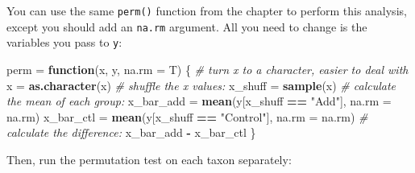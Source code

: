 \documentclass[]{book}
\newenvironment{Shaded}{\begin{snugshade}}{\end{snugshade}}
\newcommand{\KeywordTok}[1]{\textcolor[rgb]{0.13,0.29,0.53}{\textbf{#1}}}
\newcommand{\DataTypeTok}[1]{\textcolor[rgb]{0.13,0.29,0.53}{#1}}
\newcommand{\DecValTok}[1]{\textcolor[rgb]{0.00,0.00,0.81}{#1}}
\newcommand{\StringTok}[1]{\textcolor[rgb]{0.31,0.60,0.02}{#1}}
\newcommand{\CommentTok}[1]{\textcolor[rgb]{0.56,0.35,0.01}{\textit{#1}}}
\newcommand{\ControlFlowTok}[1]{\textcolor[rgb]{0.13,0.29,0.53}{\textbf{#1}}}
\newcommand{\OperatorTok}[1]{\textcolor[rgb]{0.81,0.36,0.00}{\textbf{#1}}}
\newcommand{\NormalTok}[1]{#1}
\theoremstyle{definition}
\theoremstyle{definition}
\theoremstyle{definition}
\theoremstyle{remark}
\begin{document}
You can use the same \texttt{perm()} function from the chapter to
perform this analysis, except you should add an \texttt{na.rm} argument.
All you need to change is the variables you pass to \texttt{y}:

\begin{Shaded}
\begin{Highlighting}[]
\NormalTok{perm =}\StringTok{ }\ControlFlowTok{function}\NormalTok{(x, y, }\DataTypeTok{na.rm =}\NormalTok{ T) \{}
  \CommentTok{# turn x to a character, easier to deal with}
\NormalTok{  x =}\StringTok{ }\KeywordTok{as.character}\NormalTok{(x)}
  \CommentTok{# shuffle the x values:}
\NormalTok{  x_shuff =}\StringTok{ }\KeywordTok{sample}\NormalTok{(x)}
  \CommentTok{# calculate the mean of each group:}
\NormalTok{  x_bar_add =}\StringTok{ }\KeywordTok{mean}\NormalTok{(y[x_shuff }\OperatorTok{==}\StringTok{ "Add"}\NormalTok{], }\DataTypeTok{na.rm =}\NormalTok{ na.rm)}
\NormalTok{  x_bar_ctl =}\StringTok{ }\KeywordTok{mean}\NormalTok{(y[x_shuff }\OperatorTok{==}\StringTok{ "Control"}\NormalTok{], }\DataTypeTok{na.rm =}\NormalTok{ na.rm)}
  \CommentTok{# calculate the difference:}
\NormalTok{  x_bar_add }\OperatorTok{-}\StringTok{ }\NormalTok{x_bar_ctl}
\NormalTok{\}}
\end{Highlighting}
\end{Shaded}

Then, run the permutation test on each taxon separately:

\begin{Shaded}
\end{Shaded}
\end{document}
